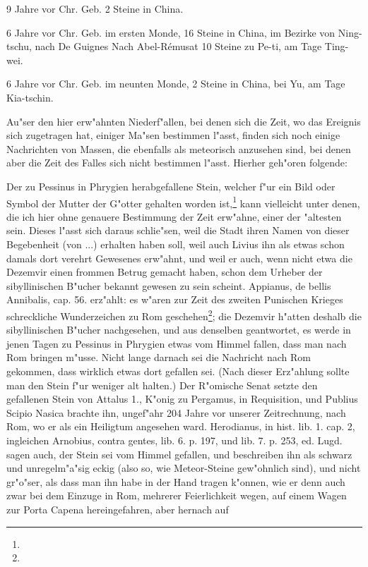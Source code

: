 \documentclass[a4paper, 11pt, oneside, polutonikogreek, german]{article}
\begin{document}
9 Jahre vor Chr. Geb. 2 Steine in China.

6 Jahre vor Chr. Geb. im ersten Monde, 16 Steine in China, im Bezirke von Ning-tschu, nach De Guignes Nach Abel-Rémusat 10 Steine zu Pe-ti, am Tage Ting-wei.

6 Jahre vor Chr. Geb. im neunten Monde, 2 Steine in China, bei Yu, am Tage Kia-tschin.

Au"ser den hier erw"ahnten Niederf"allen, bei denen sich die Zeit, wo das Ereignis sich zugetragen hat, einiger Ma"sen bestimmen l"asst, finden sich noch einige Nachrichten von Massen, die ebenfalls als meteorisch anzusehen sind, bei denen aber die Zeit des Falles sich nicht bestimmen l"asst. Hierher geh"oren folgende:

Der zu Pessinus in Phrygien herabgefallene Stein, welcher f"ur ein Bild oder Symbol der Mutter der G"otter gehalten worden ist,\footnote{} kann vielleicht unter denen, die ich hier ohne genauere Bestimmung der Zeit erw"ahne, einer der "altesten sein. Dieses l"asst sich daraus schlie"sen, weil die Stadt ihren Namen von dieser Begebenheit (von ...) erhalten haben soll, weil auch Livius ihn als etwas schon damals dort verehrt Gewesenes erw"ahnt, und weil er auch, wenn nicht etwa die Dezemvir einen frommen Betrug gemacht haben, schon dem Urheber der sibyllinischen B"ucher bekannt gewesen zu sein scheint. Appianus, de bellis Annibalis, cap. 56. erz"ahlt: es w"aren zur Zeit des zweiten Punischen Krieges schreckliche Wunderzeichen zu Rom geschehen\footnote{}; die Dezemvir h"atten deshalb die sibyllinischen B"ucher nachgesehen, und aus denselben geantwortet, es werde in jenen Tagen zu Pessinus in Phrygien etwas vom Himmel fallen, dass man nach Rom bringen m"usse. Nicht lange darnach sei die Nachricht nach Rom gekommen, dass wirklich etwas dort gefallen sei. (Nach dieser Erz"ahlung sollte man den Stein f"ur weniger alt halten.) Der R"omische Senat setzte den gefallenen Stein von Attalus 1., K"onig zu Pergamus, in Requisition, und Publius Scipio Nasica brachte ihn, ungef"ahr 204 Jahre vor unserer Zeitrechnung, nach Rom, wo er als ein Heiligtum angesehen ward. Herodianus, in hist. lib. 1. cap. 2, ingleichen Arnobius, contra gentes, lib. 6. p. 197, und lib. 7. p. 253, ed. Lugd. sagen auch, der Stein sei vom Himmel gefallen, und beschreiben ihn als schwarz und unregelm"a"sig eckig (also so, wie Meteor-Steine gew"ohnlich sind), und nicht gr"o"ser, als dass man ihn habe in der Hand tragen k"onnen, wie er denn auch zwar bei dem Einzuge in Rom, mehrerer Feierlichkeit wegen, auf einem Wagen zur Porta Capena hereingefahren, aber hernach auf 
\end{document}
